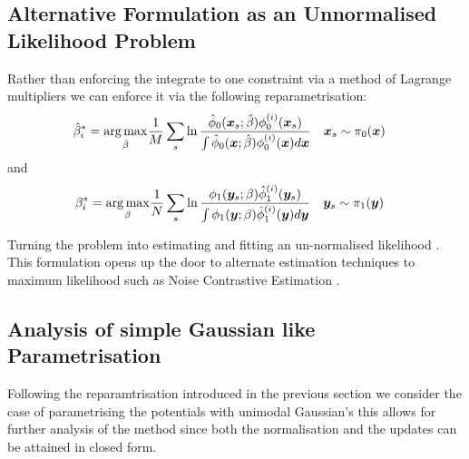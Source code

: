 \documentclass[a4paper,12pt,twoside,openright]{report}
\theoremstyle{definition}
\begin{document}
\subsection{Alternative Formulation as an Unnormalised Likelihood Problem}

Rather than enforcing the integrate to one constraint via a method of Lagrange multipliers we can enforce it via the following reparametrisation:
\begin{align}
    \hat{\beta}^*_i = \operatorname*{arg\,max}_{\hat{\beta} } &\frac{1}{M} \sum_s \operatorname{ln} \frac{{\hat{\phi}}_0({\bm{x}}_s; \hat{\beta} )   \phi_0^{(i)}({\bm{x}}_s)}{ \int {\hat{\phi}}_0({\bm{x}}; \hat{\beta} )   \phi_0^{(i)}({\bm{x}}) d{\bm{x}}}
    \quad {\bm{x}}_s\sim \pi_0({\bm{x}}) \nonumber 
\end{align}
and
\begin{align}
    {\beta}^*_i = \operatorname*{arg\,max}_{{\beta} } &\frac{1}{N} \sum_s \operatorname{ln}\frac{ \phi_1({\bm{y}}_s; {\beta} )   {\hat{\phi}}_1^{(i)}({\bm{y}}_s)}{ \int \phi_1({\bm{y}}; {\beta} )   {\hat{\phi}}_1^{(i)}({\bm{y}}) d{\bm{y}} }
    \quad {\bm{y}}_s\sim \pi_1({\bm{y}}) \nonumber 
\end{align}

Turning the problem into estimating and fitting an un-normalised likelihood \cite{gutmann2010noise}. This formulation opens up the door to alternate estimation techniques to maximum likelihood such as Noise Contrastive Estimation \cite{gutmann2010noise}.

\subsection{Analysis of simple Gaussian like Parametrisation}

Following the reparamtrisation introduced in the previous section we consider the case of parametrising the potentials with unimodal Gaussian's this allows for further analysis of the method since both the normalisation and the updates can be attained in closed form. 
\end{document}
